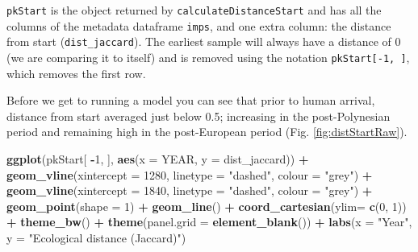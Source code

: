\documentclass[nofonts,]{tufte-handout}
\newenvironment{Shaded}{\begin{snugshade}}{\end{snugshade}}
\newcommand{\AttributeTok}[1]{\textcolor[rgb]{0.13,0.29,0.53}{#1}}
\newcommand{\DecValTok}[1]{\textcolor[rgb]{0.00,0.00,0.81}{#1}}
\newcommand{\FunctionTok}[1]{\textcolor[rgb]{0.13,0.29,0.53}{\textbf{#1}}}
\newcommand{\NormalTok}[1]{#1}
\newcommand{\SpecialCharTok}[1]{\textcolor[rgb]{0.81,0.36,0.00}{\textbf{#1}}}
\newcommand{\StringTok}[1]{\textcolor[rgb]{0.31,0.60,0.02}{#1}}
\begin{document}
\texttt{pkStart} is the object returned by
\texttt{calculateDistanceStart} and has all the columns of the metadata
dataframe \texttt{imps}, and one extra column: the distance from start
(\texttt{dist\_jaccard}). The earliest sample will always have a
distance of 0 (we are comparing it to itself) and is removed using the
notation \texttt{pkStart{[}-1,\ {]}}, which removes the first row.

Before we get to running a model you can see that prior to human
arrival, distance from start averaged just below 0.5; increasing in the
post-Polynesian period and remaining high in the post-European period
(Fig. \ref{fig:distStartRaw}).

\begin{Shaded}
\begin{Highlighting}[]
\FunctionTok{ggplot}\NormalTok{(pkStart[ }\SpecialCharTok{{-}}\DecValTok{1}\NormalTok{, ], }\FunctionTok{aes}\NormalTok{(}\AttributeTok{x =}\NormalTok{ YEAR, }\AttributeTok{y =}\NormalTok{ dist\_jaccard)) }\SpecialCharTok{+}
  \FunctionTok{geom\_vline}\NormalTok{(}\AttributeTok{xintercept =} \DecValTok{1280}\NormalTok{, }\AttributeTok{linetype =} \StringTok{"dashed"}\NormalTok{,}
             \AttributeTok{colour =} \StringTok{"grey"}\NormalTok{) }\SpecialCharTok{+}
  \FunctionTok{geom\_vline}\NormalTok{(}\AttributeTok{xintercept =} \DecValTok{1840}\NormalTok{, }\AttributeTok{linetype =} \StringTok{"dashed"}\NormalTok{,}
             \AttributeTok{colour =} \StringTok{"grey"}\NormalTok{) }\SpecialCharTok{+}
  \FunctionTok{geom\_point}\NormalTok{(}\AttributeTok{shape =} \DecValTok{1}\NormalTok{) }\SpecialCharTok{+}
  \FunctionTok{geom\_line}\NormalTok{() }\SpecialCharTok{+} 
  \FunctionTok{coord\_cartesian}\NormalTok{(}\AttributeTok{ylim=} \FunctionTok{c}\NormalTok{(}\DecValTok{0}\NormalTok{, }\DecValTok{1}\NormalTok{)) }\SpecialCharTok{+}
  \FunctionTok{theme\_bw}\NormalTok{() }\SpecialCharTok{+}
  \FunctionTok{theme}\NormalTok{(}\AttributeTok{panel.grid =} \FunctionTok{element\_blank}\NormalTok{()) }\SpecialCharTok{+}
  \FunctionTok{labs}\NormalTok{(}\AttributeTok{x =} \StringTok{"Year"}\NormalTok{, }\AttributeTok{y =} \StringTok{"Ecological distance (Jaccard)"}\NormalTok{) }
\end{Highlighting}
\end{Shaded}
\end{document}
